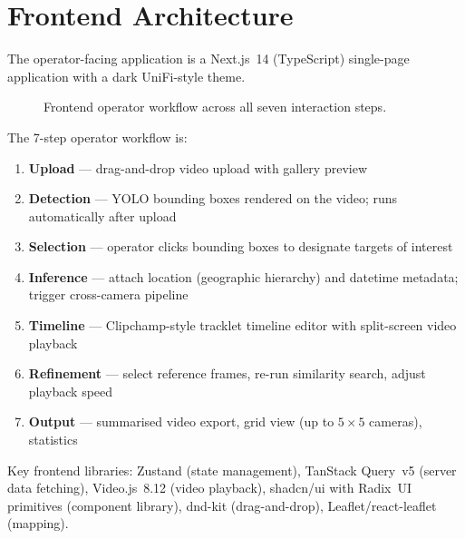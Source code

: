 \section{Frontend Architecture}

The operator-facing application is a Next.js~14 (TypeScript) single-page application with a dark UniFi-style theme.

\begin{figure}[htbp]
\centering
{}
\caption{Frontend operator workflow across all seven interaction steps.}
\label{fig:frontend}
\end{figure}

The 7-step operator workflow is:

\begin{enumerate}
    \item \textbf{Upload} --- drag-and-drop video upload with gallery preview
    \item \textbf{Detection} --- YOLO bounding boxes rendered on the video; runs automatically after upload
    \item \textbf{Selection} --- operator clicks bounding boxes to designate targets of interest
    \item \textbf{Inference} --- attach location (geographic hierarchy) and datetime metadata; trigger cross-camera pipeline
    \item \textbf{Timeline} --- Clipchamp-style tracklet timeline editor with split-screen video playback
    \item \textbf{Refinement} --- select reference frames, re-run similarity search, adjust playback speed
    \item \textbf{Output} --- summarised video export, grid view (up to $5\times5$ cameras), statistics
\end{enumerate}

Key frontend libraries: Zustand (state management), TanStack Query~v5 (server data fetching), Video.js~8.12 (video playback), shadcn/ui with Radix~UI primitives (component library), dnd-kit (drag-and-drop), Leaflet/react-leaflet (mapping).
